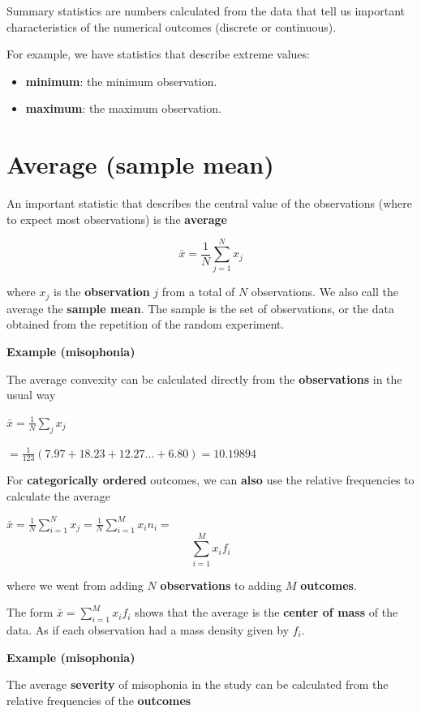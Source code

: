 \documentclass[
]{book}
\providecommand{\tightlist}{%
  \setlength{\itemsep}{0pt}\setlength{\parskip}{0pt}}
\begin{document}
Summary statistics are numbers calculated from the data that tell us important characteristics of the numerical outcomes (discrete or continuous).

For example, we have statistics that describe extreme values:

\begin{itemize}
\tightlist
\item
  \textbf{minimum}: the minimum observation.
\item
  \textbf{maximum}: the maximum observation.
\end{itemize}

\hypertarget{average-sample-mean}{%
\section{Average (sample mean)}\label{average-sample-mean}}

An important statistic that describes the central value of the observations (where to expect most observations) is the \textbf{average}

\[\bar{x}=\frac{1}{N} \sum_{j=1}^N x_j\]

where \(x_j\) is the \textbf{observation} \(j\) from a total of \(N\) observations. We also call the average the \textbf{sample mean}. The sample is the set of observations, or the data obtained from the repetition of the random experiment.

\textbf{Example (misophonia)}

The average convexity can be calculated directly from the \textbf{observations} in the usual way

\(\bar{x}= \frac{1}{ N}\sum_j x_j\)

\(= \frac{1}{123}( 7.97 + 18.23 + 12.27... + 6.80) = 10.19894\)

For \textbf{categorically ordered} outcomes, we can \textbf{also} use the relative frequencies to calculate the average

\(\bar{x}=\frac{1}{ N}\sum_{i=1}^N x_j =\frac{1}{N}\sum_{i=1}^M x_i n_ {i}=\)
\[\sum_{i=1}^M x_i f_{i}\]

where we went from adding \(N\) \textbf{observations} to adding \(M\) \textbf{outcomes}.

The form \(\bar{x}= \sum_{i = 1}^M x_i f_i\) shows that the average is the \textbf{center of mass} of the data. As if each observation had a mass density given by \(f_i\).

\textbf{Example (misophonia)}

The average \textbf{severity} of misophonia in the study can be calculated from the relative frequencies of the \textbf{outcomes}
\end{document}
